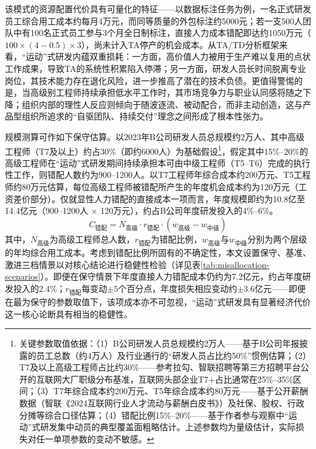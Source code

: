 该模式的资源配置代价具有可量化的特征——以数据标注任务为例，一名正式研发员工综合用工成本约每月4万元，而同等质量的外包标注约5000元；若一支500人团队中有100名正式员工参与3个月全日制标注，直接人力成本错配即达约1050万元（$100\times(4-0.5)\times3$），尚未计入TA停产的机会成本。从TA/TD分析框架来看，“运动”式研发内蕴双重损耗：一方面，高价值人力被用于生产难以复用的点状工作成果，导致TA的系统性积累陷入停滞；另一方面，研发人员长时间脱离专业岗位，其技术能力存在退化风险，进一步推高了潜在的技术负债。更值得警惕的是，当高级别工程师持续承担低水平工作时，其市场竞争力与职业认同感将随之下降；组织内部的理性人反应则倾向于随波逐流、被动配合，而非主动创造，这与产品型组织所追求的“自驱团队、持续交付”理念之间形成了根本性张力。

规模测算可作如下保守估算。以2023年B公司研发人员总规模约2万人、其中高级工程师（T7及以上）约占30\%（即约6000人）为基础假设\footnote{关键参数取值依据：（1）B公司研发人员总规模约2万人——基于B公司年报披露的员工总数（约4万人）及行业通行的“研发人员占比约50\%”惯例估算；（2）T7及以上高级工程师占比约30\%——参考拉勾、智联招聘等第三方招聘平台公开的互联网大厂职级分布基准，互联网头部企业T7+占比通常在25\%--35\%区间；（3）T7年综合成本约200万元、T5年综合成本约80万元——基于公开薪酬数据（智联《2024互联网行业人才流动与薪酬白皮书》）及社保、股权、行政分摊等综合口径估算；（4）错配比例15\%--20\%——基于作者参与观察中“运动”式研发集中动员的典型覆盖面粗略估计。上述参数均为量级估计，实际损失对任一单项参数的变动不敏感。}，假定其中15\%--20\%的高级工程师在“运动”式研发期间持续承担本可由中级工程师（T5--T6）完成的执行性工作，则错配人数约为900--1200人。以T7工程师年综合成本约200万元、T5工程师约80万元估算，每位高级工程师被错配所产生的年度机会成本约为120万元（工资差价部分）。仅就显性人力错配的直接成本一项而言，年度规模即约为10.8亿至14.4亿元（900--1200人 $\times$ 120万元），约占B公司年度研发投入的4\%--6\%。
\begin{equation}
C_{\text{错配}} = N_{\text{高级}} \cdot r_{\text{错配}} \cdot (w_{\text{高级}} - w_{\text{中级}})
\label{eq:misallocation-cost}
\end{equation}
其中，$N_{\text{高级}}$为高级工程师总人数，$r_{\text{错配}}$为错配比例，$w_{\text{高级}}$与$w_{\text{中级}}$分别为两个层级的年均综合用工成本。考虑到错配比例所固有的不确定性，本文设置保守、基准、激进三档情景以对核心结论进行稳健性检验（详见表\ref{tab:misallocation-scenarios}）。即便在保守情景下年度直接人力错配成本仍约为7.2亿元，约占年度研发投入的2.4\%；$r_{\text{错配}}$每变动$\pm 5$个百分点，年度损失相应变动约$\pm 3.6$亿元——即便在最为保守的参数取值下，该项成本亦不可忽视，“运动”式研发具有显著经济代价这一核心论断具有相当的稳健性。

